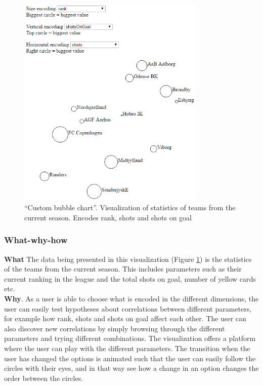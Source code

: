 \documentclass[Report.tex]{subfiles}
\begin{document}
\begin{figure}
\center
\includegraphics[width=0.8\textwidth]{"Figures/bubble_chart"}
\caption{``Custom bubble chart''. Visualization of statistics of teams from the current season. Encodes rank, shots and shots on goal}
\label{Fig:Bubbleviz}
\end{figure}

\subsubsection{What-why-how}
\textbf{What} The data being presented in this visualization (Figure \ref{Fig:Bubbleviz}) is the statistics of the teams from the current season. This includes parameters such as their current ranking in the league and the total shots on goal, number of yellow cards etc.\\

\noindent \textbf{Why}. As a user is able to choose what is encoded in the different dimensions, the user can easily test hypotheses about correlations between different parameters, for example how rank, shots and shots on goal affect each other. The user can also discover new correlations by simply browsing through the different parameters and trying different combinations. The visualization offers a platform where the user can play with the different parameters. The transition when the user has changed the options is animated such that the user can easily follow the circles with their eyes, and in that way see how a change in an option changes the order between the circles.\\
\end{document}
